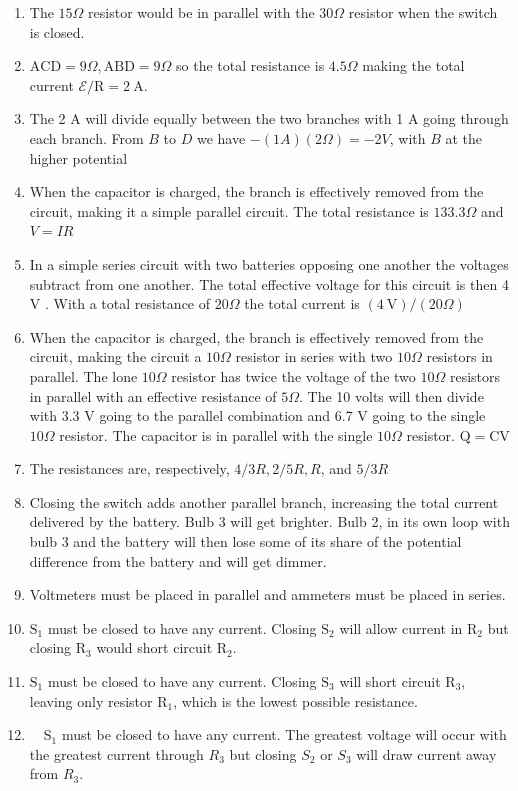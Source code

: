 \begin{enumerate}
\begin{enumerate}
  \item The $15 \Omega$ resistor would be in parallel with the $30 \Omega$ resistor when the switch is closed.
  \item $\mathrm{ACD}=9 \Omega, \mathrm{ABD}=9 \Omega$ so the total resistance is $4.5 \Omega$ making the total current $\mathcal{E} / \mathrm{R}=2 \mathrm{~A}$.
  \item The 2 A will divide equally between the two branches with 1 A going through each branch. From $B$ to $D$ we have $-(1 A)(2 \Omega)=-2 V$, with $B$ at the higher potential
  \item When the capacitor is charged, the branch is effectively removed from the circuit, making it a simple parallel circuit. The total resistance is $133.3 \Omega$ and $V=I R$
  \item In a simple series circuit with two batteries opposing one another the voltages subtract from one another. The total effective voltage for this circuit is then 4 V . With a total resistance of $20 \Omega$ the total current is $(4 \mathrm{~V}) /(20 \Omega)$
  \item When the capacitor is charged, the branch is effectively removed from the circuit, making the circuit a $10 \Omega$ resistor in series with two $10 \Omega$ resistors in parallel. The lone $10 \Omega$ resistor has twice the voltage of the two $10 \Omega$ resistors in parallel with an effective resistance of $5 \Omega$. The 10 volts will then divide with 3.3 V going to the parallel combination and 6.7 V going to the single $10 \Omega$ resistor. The capacitor is in parallel with the single $10 \Omega$ resistor. $\mathrm{Q}=\mathrm{CV}$
  \item The resistances are, respectively, $4 / 3 R, 2 / 5 R, R$, and $5 / 3 R$
  \item Closing the switch adds another parallel branch, increasing the total current delivered by the battery. Bulb 3 will get brighter. Bulb 2, in its own loop with bulb 3 and the battery will then lose some of its share of the potential difference from the battery and will get dimmer.
  \item Voltmeters must be placed in parallel and ammeters must be placed in series.
  \item $\mathrm{S}_{1}$ must be closed to have any current. Closing $\mathrm{S}_{2}$ will allow current in $\mathrm{R}_{2}$ but closing $\mathrm{R}_{3}$ would short circuit $\mathrm{R}_{2}$.
  \item $\mathrm{S}_{1}$ must be closed to have any current. Closing $\mathrm{S}_{3}$ will short circuit $\mathrm{R}_{3}$, leaving only resistor $\mathrm{R}_{1}$, which is the lowest possible resistance.
  \item $\quad \mathrm{S}_{1}$ must be closed to have any current. The greatest voltage will occur with the greatest current through $R_{3}$ but closing $S_{2}$ or $S_{3}$ will draw current away from $R_{3}$.
\end{enumerate}


\end{enumerate}
